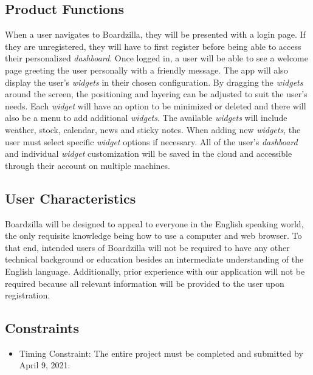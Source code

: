 \documentclass{article}
\begin{document}
\subsection{Product Functions}
\label{sub:product_functions}
When a user navigates to Boardzilla, they will be presented with a login page. If they are unregistered, they will have to first register before being able to access their personalized \textit{dashboard}. Once logged in, a user will be able to see a welcome page greeting the user personally with a friendly message. The app will also display the user's \textit{widgets} in their chosen configuration. By dragging the \textit{widgets} around the screen, the positioning and layering can be adjusted to suit the user's needs. Each \textit{widget} will have an option to be minimized or deleted and there will also be a menu to add additional \textit{widgets}. The available \textit{widgets} will include weather, stock, calendar, news and sticky notes. When adding new \textit{widgets}, the user must select specific \textit{widget} options if necessary. All of the user's \textit{dashboard} and individual \textit{widget} customization will be saved in the cloud and accessible through their account on multiple machines.

\subsection{User Characteristics}
\label{sub:user_characteristics}
Boardzilla will be designed to appeal to everyone in the English speaking world, the only requisite knowledge being how to use a computer and web browser. To that end, intended users of Boardzilla will not be required to have any other technical background or education besides an intermediate understanding of the English language. Additionally, prior experience with our application will not be required because all relevant information will be provided to the user upon registration. 

\subsection{Constraints}
\label{sub:constraints}
\begin{itemize}
    \item Timing Constraint: The entire project must be completed and submitted by April 9, 2021.
\end{itemize}
\end{document}
